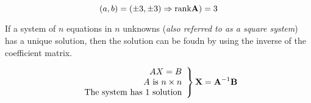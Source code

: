    \[(a,b) = (\pm 3, \pm 3) \Rightarrow \text{rank} \mathbf{A}) = 3\]

   If a system of $n$ equations in $n$ unknowns (\emph{also referred to as a square system}) has a unique solution, then the solution can be foudn by using the inverse of the coefficient matrix.

    \[\left.\begin{array}{r}
       AX=B\\
       A \text{ is } n \times n \\
       \text{The system has 1 solution}  
   \end{array}\right\} \mathbf{X} = \mathbf{A}^{-1} \mathbf{B} \]

